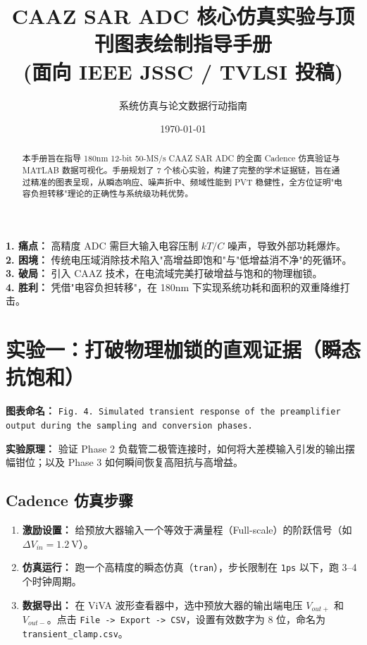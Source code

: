 \documentclass[11pt,a4paper,UTF8]{ctexart}
\title{\textbf{CAAZ SAR ADC 核心仿真实验与顶刊图表绘制指导手册} \\ \large (面向 IEEE JSSC / TVLSI 投稿)}
\author{系统仿真与论文数据行动指南}
\date{\today}
\begin{document}
\maketitle

\begin{abstract}
本手册旨在指导 180nm 12-bit 50-MS/s CAAZ SAR ADC 的全面 Cadence 仿真验证与 MATLAB 数据可视化。手册规划了 7 个核心实验，构建了完整的学术证据链，旨在通过精准的图表呈现，从瞬态响应、噪声折中、频域性能到 PVT 稳健性，全方位证明"电容负担转移"理论的正确性与系统级功耗优势。
\end{abstract}

\vspace{2ex}

\begin{tcolorbox}[colback=blue!5!white,colframe=blue!75!black,title=\textbf{论文的宏大故事线 (The Grand Storyline)}]
\textbf{1. 痛点：} 高精度 ADC 需巨大输入电容压制 $kT/C$ 噪声，导致外部功耗爆炸。\\
\textbf{2. 困境：} 传统电压域消除技术陷入"高增益即饱和"与"低增益消不净"的死循环。\\
\textbf{3. 破局：} 引入 CAAZ 技术，在电流域完美打破增益与饱和的物理枷锁。\\
\textbf{4. 胜利：} 凭借"电容负担转移"，在 180nm 下实现系统功耗和面积的双重降维打击。
\end{tcolorbox}

\section{实验一：打破物理枷锁的直观证据（瞬态抗饱和）}

\textbf{图表命名：} \texttt{Fig. 4. Simulated transient response of the preamplifier output during the sampling and conversion phases.}

\textbf{实验原理：} 验证 Phase 2 负载管二极管连接时，如何将大差模输入引发的输出摆幅钳位；以及 Phase 3 如何瞬间恢复高阻抗与高增益。

\subsection{Cadence 仿真步骤}

\begin{enumerate}[leftmargin=*]
    \item \textbf{激励设置：} 给预放大器输入一个等效于满量程（Full-scale）的阶跃信号（如 $\Delta V_{in} = \SI{1.2}{\volt}$）。
    
    \item \textbf{仿真运行：} 跑一个高精度的瞬态仿真（\texttt{tran}），步长限制在 \texttt{1ps} 以下，跑 3--4 个时钟周期。
    
    \item \textbf{数据导出：} 在 ViVA 波形查看器中，选中预放大器的输出端电压 $V_{out+}$ 和 $V_{out-}$。点击 \texttt{File -> Export -> CSV}，设置有效数字为 8 位，命名为 \texttt{transient\_clamp.csv}。
\end{enumerate}
\end{document}
